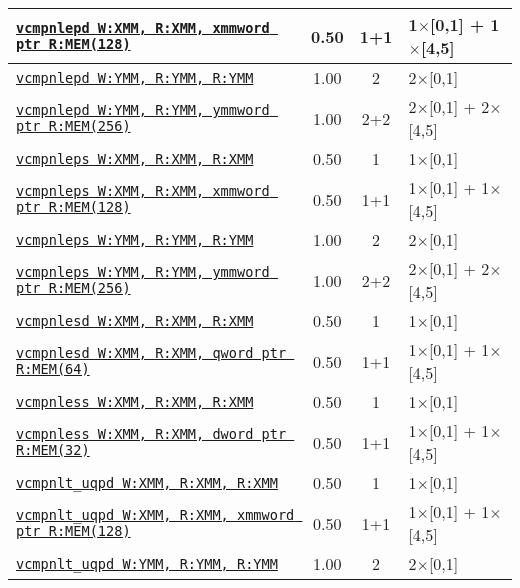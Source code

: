 \documentclass[a4paper,english,fontsize=9]{scrartcl}
\begin{document}
\begin{longtable}{p{}ccL{.25\textwidth}}
  \midrule
  \texttt{\href{https://felixcloutier.com/x86/CMPPD.html}{vcmpnlepd W:XMM, R:XMM, xmmword ptr R:MEM(128)}} & 0.50 & 1+1 & 1\(\times\)[0,1] + 1\(\times\)[4,5] \\
  \midrule
  \texttt{\href{https://felixcloutier.com/x86/CMPPD.html}{vcmpnlepd W:YMM, R:YMM, R:YMM}} & 1.00 & 2 & 2\(\times\)[0,1] \\
  \midrule
  \texttt{\href{https://felixcloutier.com/x86/CMPPD.html}{vcmpnlepd W:YMM, R:YMM, ymmword ptr R:MEM(256)}} & 1.00 & 2+2 & 2\(\times\)[0,1] + 2\(\times\)[4,5] \\
  \midrule
  \texttt{\href{https://felixcloutier.com/x86/CMPPS.html}{vcmpnleps W:XMM, R:XMM, R:XMM}} & 0.50 & 1 & 1\(\times\)[0,1] \\
  \midrule
  \texttt{\href{https://felixcloutier.com/x86/CMPPS.html}{vcmpnleps W:XMM, R:XMM, xmmword ptr R:MEM(128)}} & 0.50 & 1+1 & 1\(\times\)[0,1] + 1\(\times\)[4,5] \\
  \midrule
  \texttt{\href{https://felixcloutier.com/x86/CMPPS.html}{vcmpnleps W:YMM, R:YMM, R:YMM}} & 1.00 & 2 & 2\(\times\)[0,1] \\
  \midrule
  \texttt{\href{https://felixcloutier.com/x86/CMPPS.html}{vcmpnleps W:YMM, R:YMM, ymmword ptr R:MEM(256)}} & 1.00 & 2+2 & 2\(\times\)[0,1] + 2\(\times\)[4,5] \\
  \midrule
  \texttt{\href{https://felixcloutier.com/x86/CMPSD.html}{vcmpnlesd W:XMM, R:XMM, R:XMM}} & 0.50 & 1 & 1\(\times\)[0,1] \\
  \midrule
  \texttt{\href{https://felixcloutier.com/x86/CMPSD.html}{vcmpnlesd W:XMM, R:XMM, qword ptr R:MEM(64)}} & 0.50 & 1+1 & 1\(\times\)[0,1] + 1\(\times\)[4,5] \\
  \midrule
  \texttt{\href{https://felixcloutier.com/x86/CMPSS.html}{vcmpnless W:XMM, R:XMM, R:XMM}} & 0.50 & 1 & 1\(\times\)[0,1] \\
  \midrule
  \texttt{\href{https://felixcloutier.com/x86/CMPSS.html}{vcmpnless W:XMM, R:XMM, dword ptr R:MEM(32)}} & 0.50 & 1+1 & 1\(\times\)[0,1] + 1\(\times\)[4,5] \\
  \midrule
  \texttt{\href{https://felixcloutier.com/x86/CMPPD.html}{vcmpnlt\_uqpd W:XMM, R:XMM, R:XMM}} & 0.50 & 1 & 1\(\times\)[0,1] \\
  \midrule
  \texttt{\href{https://felixcloutier.com/x86/CMPPD.html}{vcmpnlt\_uqpd W:XMM, R:XMM, xmmword ptr R:MEM(128)}} & 0.50 & 1+1 & 1\(\times\)[0,1] + 1\(\times\)[4,5] \\
  \midrule
  \texttt{\href{https://felixcloutier.com/x86/CMPPD.html}{vcmpnlt\_uqpd W:YMM, R:YMM, R:YMM}} & 1.00 & 2 & 2\(\times\)[0,1] \\

\end{longtable}
\end{document}
